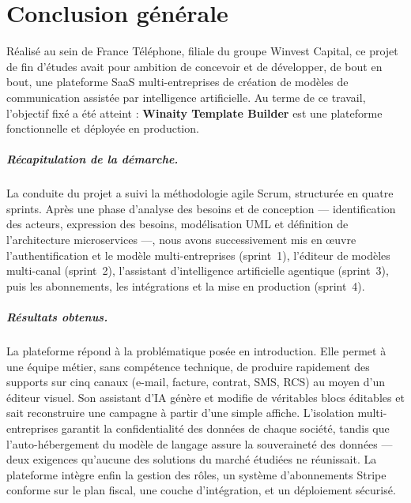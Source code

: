 \chapter*{Conclusion générale}

Réalisé au sein de France Téléphone, filiale du groupe Winvest Capital, ce
projet de fin d'études avait pour ambition de concevoir et de développer,
de bout en bout, une plateforme SaaS multi-entreprises de création de
modèles de communication assistée par intelligence artificielle. Au terme
de ce travail, l'objectif fixé a été atteint : \textbf{Winaity Template
Builder} est une plateforme fonctionnelle et déployée en production.

\paragraph{Récapitulation de la démarche.}
La conduite du projet a suivi la méthodologie agile Scrum, structurée en
quatre sprints. Après une phase d'analyse des besoins et de conception —
identification des acteurs, expression des besoins, modélisation UML et
définition de l'architecture microservices —, nous avons successivement mis
en \oe{}uvre l'authentification et le modèle multi-entreprises (sprint~1),
l'éditeur de modèles multi-canal (sprint~2), l'assistant d'intelligence
artificielle agentique (sprint~3), puis les abonnements, les intégrations et
la mise en production (sprint~4).

\paragraph{Résultats obtenus.}
La plateforme répond à la problématique posée en introduction. Elle permet à
une équipe métier, sans compétence technique, de produire rapidement des
supports sur cinq canaux (e-mail, facture, contrat, SMS, RCS) au moyen d'un
éditeur visuel. Son assistant d'IA génère et modifie de véritables blocs
éditables et sait reconstruire une campagne à partir d'une simple affiche.
L'isolation multi-entreprises garantit la confidentialité des données de
chaque société, tandis que l'auto-hébergement du modèle de langage assure la
souveraineté des données — deux exigences qu'aucune des solutions du marché
étudiées ne réunissait. La plateforme intègre enfin la gestion des rôles, un
système d'abonnements Stripe conforme sur le plan fiscal, une couche
d'intégration, et un déploiement sécurisé.

